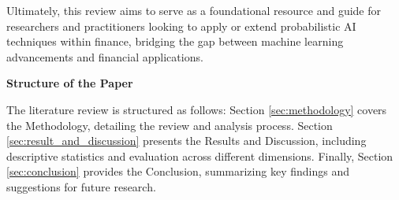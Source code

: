 Ultimately, this review aims to serve as a foundational resource and guide for researchers and practitioners looking to apply or extend probabilistic AI techniques within finance, bridging the gap between machine learning advancements and financial applications.

\textbf{Structure of the Paper}

The literature review is structured as follows: Section \ref{sec:methodology} covers the Methodology, detailing the review and analysis process. Section \ref{sec:result_and_discussion} presents the Results and Discussion, including descriptive statistics and evaluation across different dimensions. Finally, Section \ref{sec:conclusion} provides the Conclusion, summarizing key findings and suggestions for future research. 